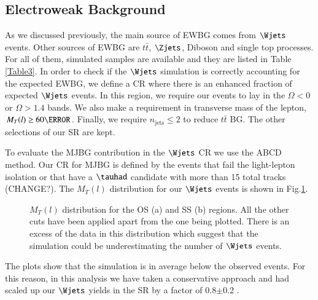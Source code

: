 \subsection{Electroweak Background}
As we discussed previously, the main source of EWBG comes from $\Wjets$ events. Other sources of EWBG are $t\bar{t}$, $\Zjets$, Diboson and single top processes. For all of them, simulated samples are available and they are listed in Table \ref{Table3}. In order to check if the $\Wjets$  simulation is correctly accounting for the expected EWBG, we define a CR where there is an enhanced fraction of expected $\Wjets$ events. In this region, we require our events to lay in the $\Omega<0$ or $\Omega>1.4$ bands. We also make a requirement in transverse mass of the lepton, $M_T(l)\ge 60 \GeV$. Finally, we require $n_{\text{jets}}\le 2$ to reduce $t\bar{t}$ BG. The other selections of our SR are kept.

To evaluate the MJBG contribution in the $\Wjets$ CR we use the ABCD method. Our CR for MJBG is defined by the events that fail the light-lepton isolation or that have a $\tauhad$ candidate with more than 15 total tracks (CHANGE?). The  $M_T(l)$ distribution for our $\Wjets$ events is shown in Fig.\ref{Fig8}. 
\begin{figure}[htbp]
	\centering
	\hfill
	\caption{$M_T(l)$ distribution for the OS (a) and SS (b) regions. All the other cuts have been applied apart from the one being plotted. There is an excess of the data in this distribution which suggest that the simulation could be underestimating the number of $\Wjets$ events.}
	\label{Fig8}
\end{figure} 
The plots show that the simulation is in average below the observed events. For this reason, in this analysis we have taken a conservative approach and had scaled up our $\Wjets$ yields in the SR by a factor of 0.8$\pm$0.2 .